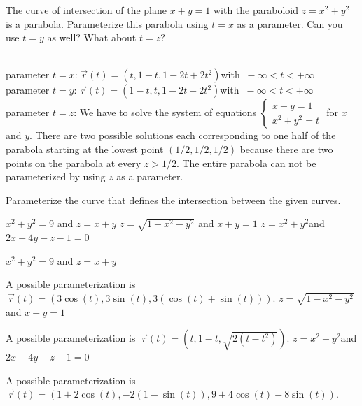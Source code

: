 \begin{Exercise}[difficulty = 1] The curve of intersection of the plane $x+y=1$ with the paraboloid $z = x^2 + y^2$ is a parabola. Parameterize this  parabola  using $t=x$ as a parameter. Can you use $t=y$ as well? What about $t=z$?  %

\end{Exercise}

\begin{Answer}\phantom{}\\
    parameter $t=x$: \quad $\vec r (t) = \left( t, 1-t, 1-2t+2t^2 \right) $\quad with $\  - \infty < t < + \infty$\\
    parameter $t=y$: \quad $\vec r (t) = \left(1-t, t, 1-2t+2t^2 \right) $\quad with $\ - \infty < t < + \infty$\\
    parameter $t=z$: We have to solve the system of equations  $\left\{\begin{array}{l} x+y=1 \\ x^2+y^2=t \end{array}  \right.$ for $x$ and $y$. There are two possible solutions each corresponding to one half of the parabola starting at the lowest point $(1/2,1/2,1/2) $ because there are two points on the parabola at every  $z>1/2$. The entire parabola can not be parameterized by using $z$ as a parameter.
\end{Answer}
    
\begin{Exercise} Parameterize the curve that defines  the intersection between the given curves. %
     \begin{multicols}{2}
         \Question[difficulty = 1] $x^2+y^2 = 9$ \quad and \quad $z=x+y$
         \Question[difficulty = 1] $z=\sqrt{1-x^2-y^2}$ \quad and \quad $x+y=1$
         \Question[difficulty = 2] $z = x^2+y^2$\quad and \quad $2x-4y-z-1=0$
        \EndCurrentQuestion
	 \end{multicols}
	
\end{Exercise}

\begin{Answer}\phantom{}
    
         \Question $x^2+y^2 = 9$ \quad and \quad $z=x+y$ 
         
          A possible parameterization is $\ \vec r(t) = (3 \cos (t), 3 \sin (t), 3(\cos(t) + \sin(t)))$.
         \Question $z=\sqrt{1-x^2-y^2}$ \quad and \quad $x+y=1$ 
         
          A possible parameterization is $\ \vec r(t) = \left(t, 1-t, \sqrt{2(t-t^2)}\right)$.
         \Question $z = x^2+y^2$\quad and \quad $2x-4y-z-1=0$ 
         
          A possible parameterization is $\ \vec r(t) = (1+2\cos(t),-2(1- \sin(t)), 9+4 \cos(t)-8\sin(t))$.
     
\end{Answer}

